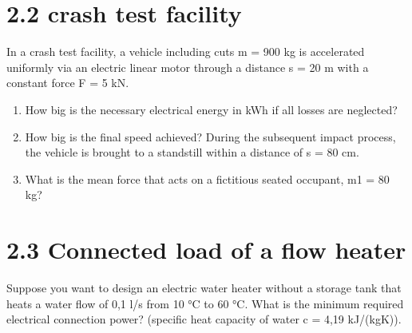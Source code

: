 \documentclass[10pt,ngerman]{scrartcl}
\begin{document}
\section{2.2 crash test facility}
In a crash test facility, a vehicle including cuts m = 900 kg is accelerated uniformly via an electric linear motor through a distance s = 20 m with a constant force F = 5 kN.
\begin{enumerate}
	\item How big is the necessary electrical energy in kWh if all losses are neglected?
	\item How big is the final speed achieved? During the subsequent impact process, the vehicle is brought to a standstill within a distance of s = 80 cm.
	\item What is the mean force that acts on a fictitious seated occupant, m1 = 80 kg?
\end{enumerate}

\section{2.3 Connected load of a flow heater}
Suppose you want to design an electric water heater without a storage tank that heats a water flow of 0,1 l/s from 10 °C to 60 °C. What is the minimum required electrical connection power? (specific heat capacity of water c = 4,19 kJ/(kgK)).
\end{document}
